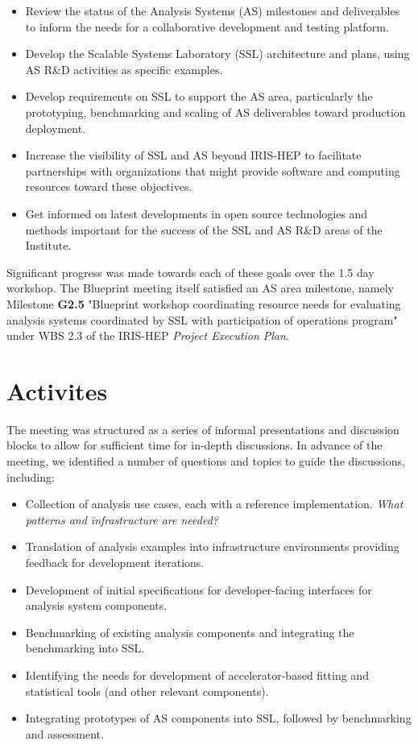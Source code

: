 \documentclass[11pt,letterpaper,fleqn]{article}
\begin{document}
\begin{itemize}
  \item Review the status of the Analysis Systems (AS) milestones and deliverables to inform the needs for a collaborative development and testing platform.
  \item Develop the Scalable Systems Laboratory (SSL) architecture and plans, using AS R\&D activities as specific examples.
  \item Develop requirements on SSL to support the AS area, particularly the prototyping, benchmarking and scaling of AS deliverables toward production deployment.
  \item Increase the visibility of SSL and AS beyond IRIS-HEP to facilitate partnerships with organizations that might provide software and computing resources toward these objectives.
  \item Get informed on latest developments in open source technologies and methods important for the success of the SSL and AS R\&D areas of the Institute.
\end{itemize}

Significant progress was made towards each of these goals over the 1.5 day workshop. The Blueprint meeting itself satisfied an AS area milestone, namely Milestone {\bf G2.5} "Blueprint workshop coordinating resource needs for evaluating analysis systems coordinated by SSL with participation of operations program" under WBS 2.3 of the IRIS-HEP \textit{Project Execution Plan}.

\section{Activites}
\vspace{0.2cm}
The meeting was structured as a series of informal presentations and discussion blocks to allow for sufficient time for in-depth discussions.  In advance of the meeting, we identified a number of questions and topics to guide the discussions, including:

\begin{itemize}
  \item Collection of analysis use cases, each with a reference implementation.  \textit{What patterns and infrastructure are needed?}
  \item Translation of analysis examples into infrastructure environments providing feedback for development iterations.
  \item Development of initial specifications for developer-facing interfaces for analysis system components.
  \item Benchmarking of existing analysis components and integrating the benchmarking into SSL.
  \item Identifying the needs for development of accelerator-based fitting and statistical tools (and other relevant components).
  \item Integrating prototypes of AS components into SSL, followed by benchmarking and assessment.
\end{itemize}
\end{document}
